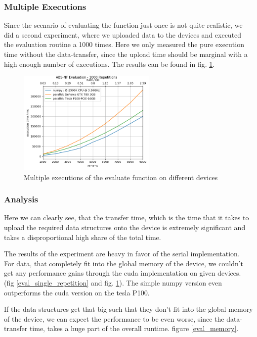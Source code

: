 \subsubsection{Multiple Executions}

Since the scenario of evaluating the function just once is not quite realistic, we did a second experiment, where we uploaded data to the devices and executed the evaluation routine a 1000 times. Here we only measured the pure execution time without the data-transfer, since the upload time should be marginal with a high enough number of executions. The results can be found in fig. \ref{eval_1000}.

\begin{figure}[ht]
	\centering
	\includegraphics[width=0.6\textwidth]{img/eval_mult_repetition.png}
	\caption{Multiple executions of the evaluate function on different devices}
	\label{eval_1000}
\end{figure}

\subsubsection{Analysis}

 Here we can clearly see, that the transfer time, which is the time that it takes to upload the required data structures onto the device is extremely significant and takes a disproportional high share of the total time.

The results of the experiment are heavy in favor of the serial implementation.\\
For data, that completely fit into the global memory of the device, we couldn't get any performance gains through the cuda implementation on given devices. (fig \ref{eval_single_repetition} and  fig. \ref{eval_1000}). The simple numpy version even outperforms the cuda version on the tesla P100.

If the data structures get that big such that they don't fit into the global memory of the device, we can expect the performance to be even worse, since the data-transfer time, takes a huge part of the overall runtime. figure \ref{eval_memory}.

